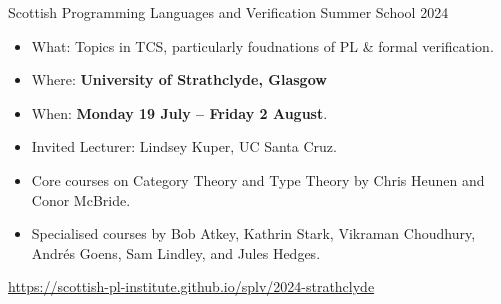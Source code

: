 \documentclass[handout]{beamer}
\begin{document}
\begin{frame}{Scottish Programming Languages and Verification Summer School 2024}
\begin{itemize}
  \item What: Topics in TCS, particularly foudnations of PL \& formal verification.
  \item Where: \textbf{University of Strathclyde, Glasgow}
  \item When: \textbf{Monday 19 July -- Friday 2 August}.
  \item Invited Lecturer: Lindsey Kuper, UC Santa Cruz.
  \item Core courses on Category Theory and Type Theory by Chris Heunen and Conor McBride.
  \item Specialised courses by Bob Atkey, Kathrin Stark, Vikraman Choudhury, Andr\'{e}s Goens, Sam Lindley, and Jules Hedges.
\end{itemize}

\begin{center}
  \url{https://scottish-pl-institute.github.io/splv/2024-strathclyde}
\end{center}
\end{frame}
\end{document}
